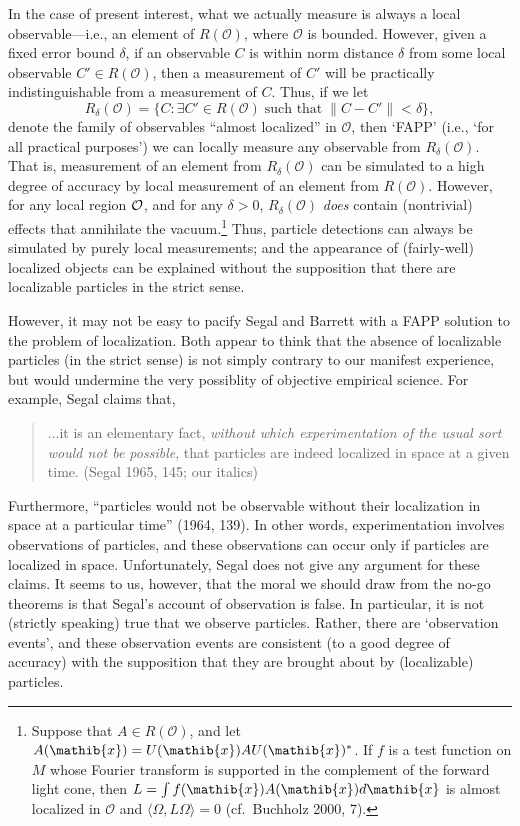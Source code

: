 \documentclass[12pt]{article}
\theoremstyle{remark}
\newcommand{\norm}[1]{\mbox{$\| #1\|$}}
\newcommand{\hil}[1]{\mathcal{#1}}
\begin{document}
In the case of present interest, what we actually measure is always a
local observable---i.e., an element of $R(\mathcal{O})$, where
$\mathcal{O}$ is bounded.  However, given a fixed error bound
$\delta$, if an observable $C$ is within norm distance $\delta$ from
some local observable $C'\in R(\mathcal{O})$, then a measurement of
$C'$ will be practically indistinguishable from a measurement of $C$.
Thus, if we let \begin{equation} R_{\delta}(\mathcal{O})= \{ C:
  \exists C' \in R(\mathcal{O})\; \mbox{such that}\;
  \norm{C-C'}<\delta \} ,\end{equation} denote the family of
observables ``almost localized'' in $\mathcal{O}$, then `FAPP' (i.e.,
`for all practical purposes') we can locally measure any observable
from $R_{\delta}(\mathcal{O})$.  That is, measurement of an element
from $R_{\delta}(\mathcal{O})$ can be simulated to a high degree of
accuracy by local measurement of an element from $R(\mathcal{O})$.
However, for any local region $\cal{O}$, and for any $\delta >0$,
$R_{\delta}(\mathcal{O})$ \emph{does} contain (nontrivial) effects
that annihilate the vacuum.\footnote{Suppose that $A\in R(\hil{O})$,
  and let $A(\mathib{x})=U(\mathib{x})AU(\mathib{x})^{*}$.  If $f$ is
  a test function on $M$ whose Fourier transform is supported in the
  complement of the forward light cone, then $L=\int
  f(\mathib{x})A(\mathib{x})d\mathib{x}$ is almost localized in
  $\hil{O}$ and $\langle \Omega ,L\Omega \rangle=0$ (cf.~Buchholz
  2000, 7).}  Thus, particle detections can always be simulated by
purely local measurements; and the appearance of (fairly-well)
localized objects can be explained without the supposition that there
are localizable particles in the strict sense.

However, it may not be easy to pacify Segal and Barrett with a FAPP
solution to the problem of localization.  Both appear to think that
the absence of localizable particles (in the strict sense) is not
simply contrary to our manifest experience, but would undermine the
very possiblity of objective empirical science.  For example, Segal
claims that,
\begin{quote} ...it
  is an elementary fact, \emph{without which experimentation of the
    usual sort would not be possible}, that particles are indeed
  localized in space at a given time. (Segal 1965, 145; our italics)
\end{quote} Furthermore, ``particles would not be observable without their localization in
space at a particular time'' (1964, 139).  In other words,
experimentation involves observations of particles, and these
observations can occur only if particles are localized in space.
Unfortunately, Segal does not give any argument for these claims.  It
seems to us, however, that the moral we should draw from the no-go
theorems is that Segal's account of observation is false.  In
particular, it is not (strictly speaking) true that we observe
particles.  Rather, there are `observation events', and these
observation events are consistent (to a good degree of accuracy) with
the supposition that they are brought about by (localizable)
particles.
\end{document}
